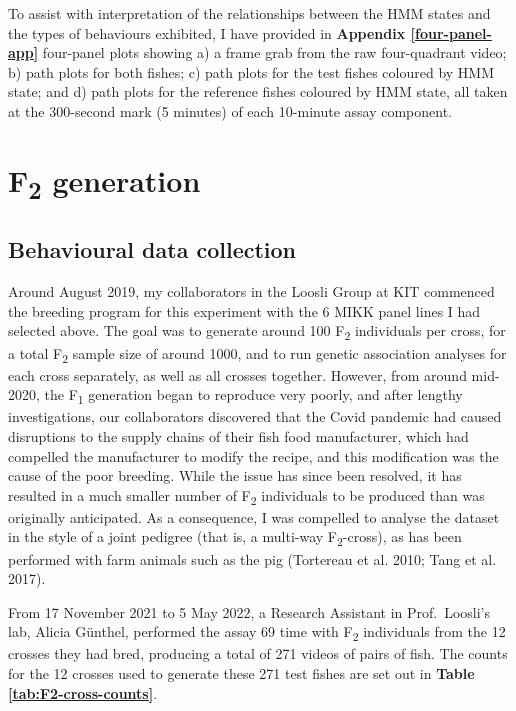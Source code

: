 \documentclass[
]{book}
\begin{document}
To assist with interpretation of the relationships between the HMM states and the types of behaviours exhibited, I have provided in \textbf{Appendix \ref{four-panel-app}} four-panel plots showing a) a frame grab from the raw four-quadrant video; b) path plots for both fishes; c) path plots for the test fishes coloured by HMM state; and d) path plots for the reference fishes coloured by HMM state, all taken at the 300-second mark (5 minutes) of each 10-minute assay component.

\clearpage

\hypertarget{f2-generation}{%
\section{\texorpdfstring{F\textsubscript{2} generation}{F2 generation}}\label{f2-generation}}

\hypertarget{behavioural-data-collection}{%
\subsection{Behavioural data collection}\label{behavioural-data-collection}}

Around August 2019, my collaborators in the Loosli Group at KIT commenced the breeding program for this experiment with the 6 MIKK panel lines I had selected above. The goal was to generate around 100 F\textsubscript{2} individuals per cross, for a total F\textsubscript{2} sample size of around 1000, and to run genetic association analyses for each cross separately, as well as all crosses together. However, from around mid-2020, the F\textsubscript{1} generation began to reproduce very poorly, and after lengthy investigations, our collaborators discovered that the Covid pandemic had caused disruptions to the supply chains of their fish food manufacturer, which had compelled the manufacturer to modify the recipe, and this modification was the cause of the poor breeding. While the issue has since been resolved, it has resulted in a much smaller number of F\textsubscript{2} individuals to be produced than was originally anticipated. As a consequence, I was compelled to analyse the dataset in the style of a joint pedigree (that is, a multi-way F\textsubscript{2}-cross), as has been performed with farm animals such as the pig (Tortereau et al. 2010; Tang et al. 2017).

From 17 November 2021 to 5 May 2022, a Research Assistant in Prof.~Loosli's lab, Alicia Günthel, performed the assay 69 time with F\textsubscript{2} individuals from the 12 crosses they had bred, producing a total of 271 videos of pairs of fish. The counts for the 12 crosses used to generate these 271 test fishes are set out in \textbf{Table \ref{tab:F2-cross-counts}}.
\end{document}
